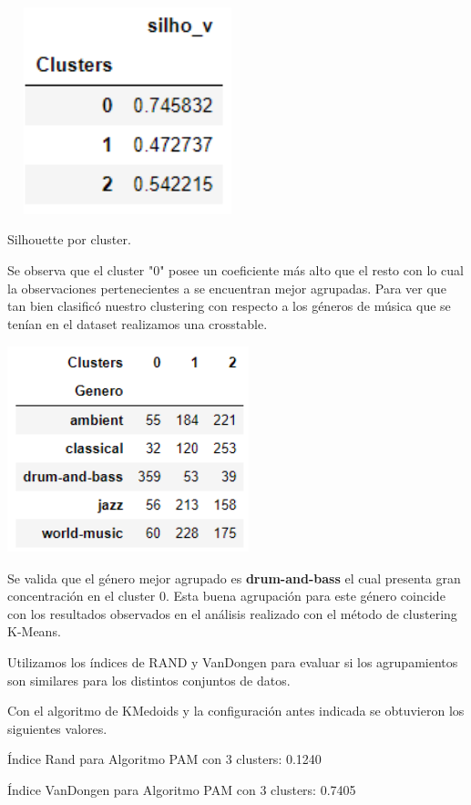 \documentclass{icisfinal}
\begin{document}
\includegraphics[width=7cm, height=6cm]{img/imagenes/6silohu_group}

Silhouette por cluster.

Se observa que el cluster "0" posee un coeficiente más alto que el resto con lo cual la observaciones pertenecientes a se encuentran mejor agrupadas. Para ver que tan bien clasificó nuestro clustering con respecto a los géneros de música que se tenían en el dataset realizamos una crosstable.

\includegraphics[width=7cm, height=6cm]{img/imagenes/5crosstab_PAM}

Se valida que el género mejor agrupado es \textbf{drum-and-bass} el cual presenta gran concentración en el cluster 0. Esta buena agrupación para este género coincide con los resultados observados en el análisis realizado con el método de clustering K-Means.

Utilizamos los índices de RAND y VanDongen para evaluar si los agrupamientos son similares para los distintos conjuntos de datos.

Con el algoritmo de KMedoids y la configuración antes indicada se obtuvieron los siguientes valores.

Índice Rand para Algoritmo PAM con 3 clusters: 0.1240

Índice VanDongen para Algoritmo PAM con 3 clusters: 0.7405
\end{document}
